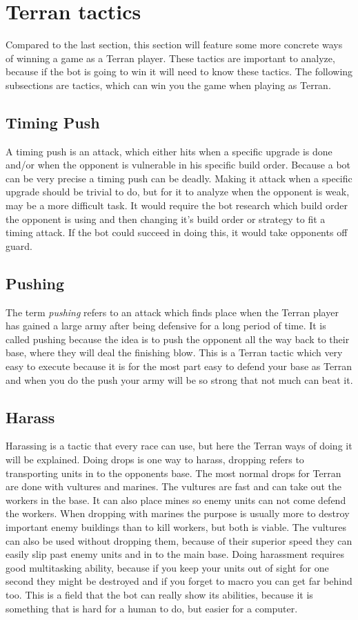 \section{Terran tactics}
	Compared to the last section, this section will feature some more concrete ways of winning a game as a Terran player. 
	These tactics are important to analyze, because if the bot is going to win it will need to know these tactics.
	The following subsections are tactics, which can win you the game when playing as Terran.
	
	\subsection{Timing Push}
		A timing push is an attack, which either hits when a specific upgrade is done and/or when the opponent is vulnerable in his specific build order. 
		Because a bot can be very precise a timing push can be deadly. Making it attack when a specific upgrade should be trivial to do, but for it to 
		analyze when the opponent is weak, may be a more difficult task. It would require the bot research which build order the opponent is using and 
		then changing it's build order or strategy to fit a timing attack. If the bot could succeed in doing this, it would take opponents off guard.
		
	\subsection{Pushing}
		The term {\it pushing} refers to an attack which finds place when the Terran player has gained a large army after being defensive for a long 
		period of time. It is called pushing because the idea is to push the opponent 
		all the way back to their base, where they will deal the finishing blow. This is a Terran tactic which very easy to execute because it is for the 
		most part easy to defend your base as Terran and when you do the push your army will be so strong that not much can beat it.
		
	\subsection{Harass}
		Harassing is a tactic that every race can use, but here the Terran ways of doing it will be explained. Doing drops is one way to harass, dropping 
		refers to transporting units in to the opponents base. The most normal drops for Terran are done with vultures and marines. The vultures are 
		fast and can take out the workers in the base. It can also place mines so enemy units can not come defend the workers. When dropping with marines 
		the purpose is usually more to destroy important enemy buildings than to kill workers, but both is viable. The vultures can also be used without 
		dropping them, because of their superior speed they can easily slip past enemy units and in to the main base. Doing harassment requires 
		good multitasking ability, because if you keep your units out of sight for one second they might be destroyed and if you forget to macro you can 
		get far behind too. This is a field that the bot can really show its abilities, because it is something that is hard for a human to do, but 
		easier for a computer.
	
